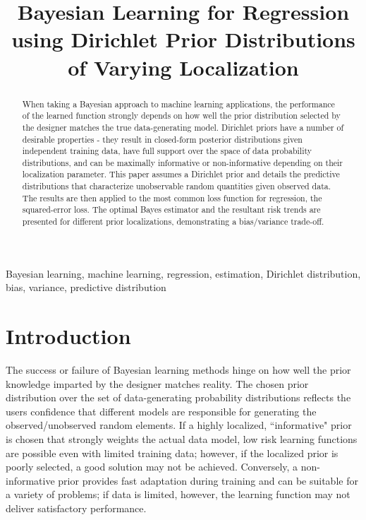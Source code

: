 \documentclass{article}
\title{Bayesian Learning for Regression using Dirichlet Prior Distributions of Varying Localization}
\begin{document}
\maketitle


\begin{abstract}
When taking a Bayesian approach to machine learning applications, the performance of the learned function strongly depends on how well the prior distribution selected by the designer matches the true data-generating model. Dirichlet priors have a number of desirable properties - they result in closed-form posterior distributions given independent training data, have full support over the space of data probability distributions, and can be maximally informative or non-informative depending on their localization parameter. This paper assumes a Dirichlet prior and details the predictive distributions that characterize unobservable random quantities given observed data. The results are then applied to the most common loss function for regression, the squared-error loss. The optimal Bayes estimator and the resultant risk trends are presented for different prior localizations, demonstrating a bias/variance trade-off.
\end{abstract}

\begin{keywords}
Bayesian learning, machine learning, regression, estimation, Dirichlet distribution, bias, variance, predictive distribution
\end{keywords}



\section{Introduction}

The success or failure of Bayesian learning methods hinge on how well the prior knowledge imparted by the designer matches reality. The chosen prior distribution over the set of data-generating probability distributions reflects the users confidence that different models are responsible for generating the observed/unobserved random elements. If a highly localized, ``informative" prior is chosen that strongly weights the actual data model, low risk learning functions are possible even with limited training data; however, if the localized prior is poorly selected, a good solution may not be achieved. Conversely, a non-informative prior provides fast adaptation during training and can be suitable for a variety of problems; if data is limited, however, the learning function may not deliver satisfactory performance.
\end{document}
